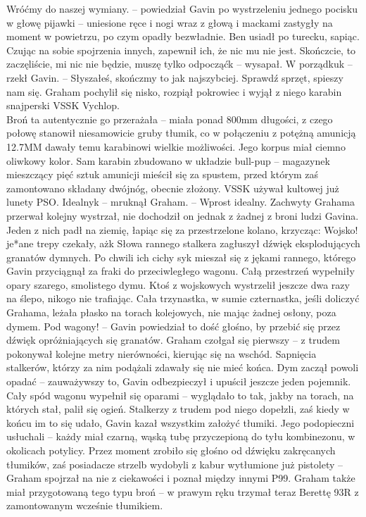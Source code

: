 \documentclass[../MAIN.tex]{subfiles}
\begin{document}
\sx Wróćmy do naszej wymiany. -- powiedział Gavin po wystrzeleniu jednego pocisku w głowę pijawki -- uniesione ręce i nogi wraz z głową i mackami zastygły na moment w powietrzu, po czym opadły bezwładnie.
\qd
Ben usiadł po turecku, sapiąc. Czując na sobie spojrzenia innych, zapewnił ich, że nic mu nie jest.
\sx Skończcie, to zaczęliście, mi nic nie będzie, muszę tylko odpocząć\3k -- wysapał.
\xx W porządku\3k -- rzekł Gavin. -- Słyszałeś, skończmy to jak najszybciej. Sprawdź sprzęt, spieszy nam się.
\qd
Graham pochylił się nisko, rozpiął pokrowiec i wyjął z niego karabin snajperski VSSK Vychlop.\\
Broń ta autentycznie go przerażała -- miała ponad 800mm długości, z czego połowę stanowił niesamowicie gruby tłumik, co w połączeniu z potężną amunicją 12.7MM dawały temu karabinowi wielkie możliwości. Jego korpus miał ciemno oliwkowy kolor. Sam karabin zbudowano w układzie bull-pup -- magazynek mieszczący pięć sztuk amunicji mieścił się za spustem, przed którym zaś zamontowano składany dwójnóg, obecnie złożony. VSSK używał kultowej już lunety PSO.
\sx Idealny\3k -- mruknął Graham. -- Wprost idealny.\qd
Zachwyty Grahama przerwał kolejny wystrzał, nie dochodził on jednak z żadnej z broni ludzi Gavina. Jeden z nich padł na ziemię, łapiąc się za przestrzelone kolano, krzycząc:
\sx Wojsko! je*ane trepy czekały, aż\3k
\qd 
Słowa rannego stalkera zagłuszył dźwięk eksplodujących granatów dymnych. Po chwili ich cichy syk mieszał się z jękami rannego, którego Gavin przyciągnął za fraki do przeciwległego wagonu.
Całą przestrzeń wypełniły opary szarego, smolistego dymu. Ktoś z wojskowych wystrzelił jeszcze dwa razy na ślepo, nikogo nie trafiając. Cała trzynastka, w sumie czternastka, jeśli doliczyć Grahama, leżała płasko na torach kolejowych, nie mając żadnej osłony, poza dymem.
\sx Pod wagony! -- Gavin powiedział to dość głośno, by przebić się przez dźwięk opróżniających się granatów.
\qd
Graham czołgał się pierwszy -- z trudem pokonywał kolejne metry nierówności, kierując się na wschód. Sapnięcia stalkerów, którzy za nim podążali zdawały się nie mieć końca.
Dym zaczął powoli opadać -- zauważywszy to, Gavin odbezpieczył i upuścił jeszcze jeden pojemnik.\\
Cały spód wagonu wypełnił się oparami -- wyglądało to tak, jakby na torach, na których stał, palił się ogień. Stalkerzy z trudem pod niego dopełzli, zaś kiedy w końcu im to się udało, Gavin kazał wszystkim założyć tłumiki. Jego podopieczni usłuchali -- każdy miał czarną, wąską tubę przyczepioną do tyłu kombinezonu, w okolicach potylicy. Przez moment zrobiło się głośno od dźwięku zakręcanych tłumików, zaś posiadacze strzelb wydobyli z kabur wytłumione już pistolety -- Graham spojrzał na nie z ciekawości i poznał między innymi P99. Graham także miał przygotowaną tego typu broń -- w prawym ręku trzymał teraz Berettę 93R z zamontowanym wcześnie tłumikiem.
\end{document}
